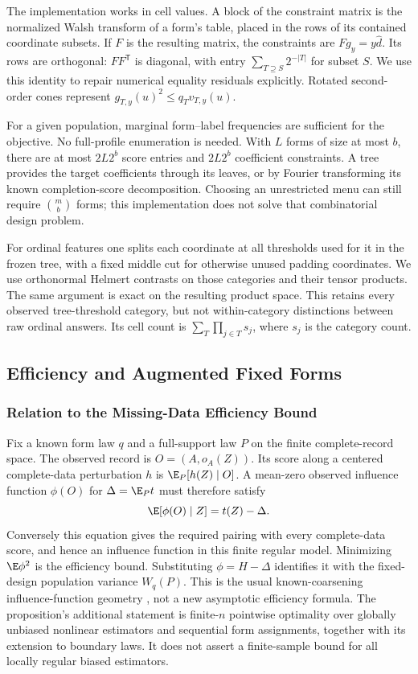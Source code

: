 The implementation works in cell values. A block of the constraint matrix
is the normalized Walsh transform of a form's table, placed in the rows of
its contained coordinate subsets. If $F$ is the resulting matrix, the
constraints are $Fg_y=y\widehat d$. Its rows are orthogonal:
$FF^{\mathsf T}$ is diagonal, with entry
$\sum_{T\supseteq S}2^{-|T|}$ for subset $S$. We use this identity to
repair numerical equality residuals explicitly. Rotated second-order cones
represent $g_{T,y}(u)^2\le q_Tv_{T,y}(u)$.

For a given population, marginal form--label frequencies are sufficient for
the objective. No full-profile enumeration is needed. With $L$ forms of
size at most $b$, there are at most $2L2^b$ score entries and $2L2^b$
coefficient constraints. A tree provides the target coefficients through
its leaves, or by Fourier transforming its known completion-score
decomposition. Choosing an unrestricted menu can still require
$\binom mb$ forms; this implementation does not solve that combinatorial
design problem.

For ordinal features one splits each coordinate at all thresholds used for it
in the frozen tree, with a fixed middle cut for otherwise unused padding
coordinates. We use orthonormal Helmert contrasts on those categories and
their tensor products. The same argument is exact on the resulting product
space. This retains every observed tree-threshold category, but not
within-category distinctions between raw ordinal answers. Its cell count
is $\sum_T\prod_{j\in T}s_j$, where $s_j$ is the category count.


\subsection{Efficiency and Augmented Fixed Forms}\label{app:augmentation}
\subsubsection{Relation to the Missing-Data Efficiency Bound}
Fix a known form law $q$ and a full-support law $P$ on the finite complete-record space. The observed record is $O=(A,o_A(Z))$. Its score along a centered complete-data perturbation $h$ is $\E_P[h(Z)\mid O]$. A mean-zero observed influence function $\phi(O)$ for $\Delta=\E_Pt$ must therefore satisfy
\[
 \E[\phi(O)\mid Z]=t(Z)-\Delta.
\]
Conversely this equation gives the required pairing with every complete-data score, and hence an influence function in this finite regular model. Minimizing $\E\phi^2$ is the efficiency bound. Substituting $\phi=H-\Delta$ identifies it with the fixed-design population variance $W_q(P)$. This is the usual known-coarsening influence-function geometry \citep{robins1994,tsiatis2006}, not a new asymptotic efficiency formula. The proposition's additional statement is finite-$n$ pointwise optimality over globally unbiased nonlinear estimators and sequential form assignments, together with its extension to boundary laws. It does not assert a finite-sample bound for all locally regular biased estimators.

